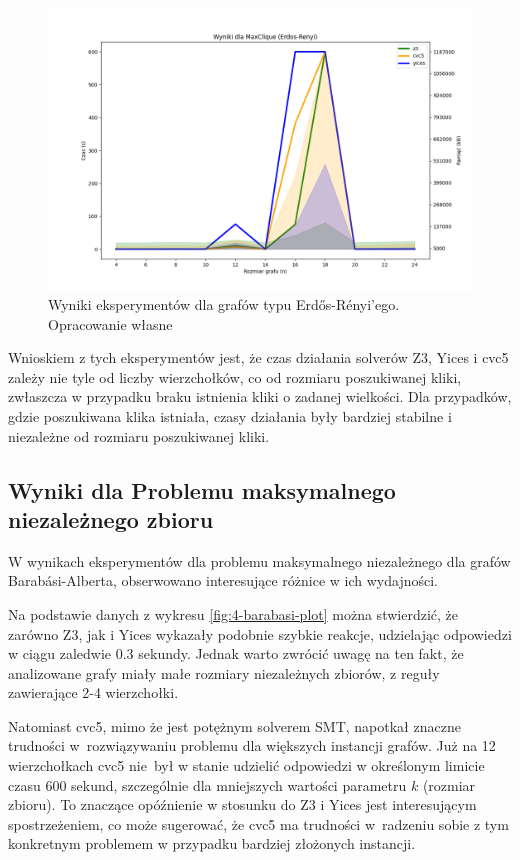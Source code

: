 \begin{figure}[htbp]
	\centering
	\begin{minipage}{\textwidth}
		\includegraphics[width=\textwidth]{./figures/3-erdos-renyi-plot.png}
		\caption{Wyniki eksperymentów dla grafów typu Erdős-Rényi'ego. Opracowanie własne}
		\label{fig:3-erdos-renyi-plot}
	\end{minipage}
\end{figure}

Wnioskiem z tych eksperymentów jest, że czas działania solverów Z3, Yices i cvc5 zależy nie tyle od liczby wierzchołków, co od rozmiaru poszukiwanej kliki, zwłaszcza w przypadku braku istnienia kliki o zadanej wielkości. Dla przypadków, gdzie poszukiwana klika istniała, czasy działania były bardziej stabilne i niezależne od rozmiaru poszukiwanej kliki.


\subsection{Wyniki dla Problemu maksymalnego niezależnego zbioru}

W wynikach eksperymentów dla problemu maksymalnego niezależnego dla grafów Barabási-Alberta, obserwowano interesujące różnice w ich wydajności.

Na podstawie danych z wykresu \ref{fig:4-barabasi-plot} można stwierdzić, że zarówno Z3, jak i Yices wykazały podobnie szybkie reakcje, udzielając odpowiedzi w ciągu zaledwie 0.3 sekundy. Jednak warto zwrócić uwagę na ten fakt, że analizowane grafy miały małe rozmiary niezależnych zbiorów, z reguły zawierające 2-4 wierzchołki.

Natomiast cvc5, mimo że jest potężnym solverem SMT, napotkał znaczne trudności w~rozwiązywaniu problemu dla większych instancji grafów. Już na 12 wierzchołkach cvc5 nie~był w stanie udzielić odpowiedzi w określonym limicie czasu 600 sekund, szczególnie dla mniejszych wartości parametru $k$ (rozmiar zbioru). To znaczące opóźnienie w stosunku do Z3 i Yices jest interesującym spostrzeżeniem, co może sugerować, że cvc5 ma trudności w~radzeniu sobie z tym konkretnym problemem w przypadku bardziej złożonych instancji.

